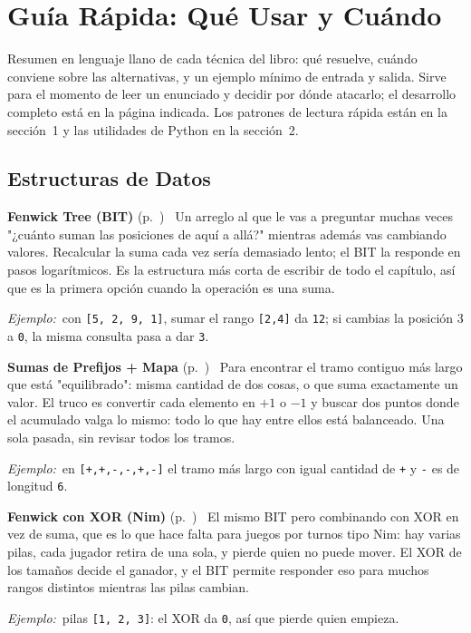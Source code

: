 \clearpage
\section{Guía Rápida: Qué Usar y Cuándo}

Resumen en lenguaje llano de cada técnica del libro: qué resuelve, cuándo conviene
sobre las alternativas, y un ejemplo mínimo de entrada y salida. Sirve para el
momento de leer un enunciado y decidir por dónde atacarlo; el desarrollo completo
está en la página indicada. Los patrones de lectura rápida están en la sección~1 y
las utilidades de Python en la sección~2.

\newcommand{\guia}[2]{\medskip\noindent\textbf{#1} \textnormal{(p.~\pageref{#2})}\ }
\newcommand{\ej}{\par\smallskip\noindent\textit{Ejemplo:}\ }

\subsection*{Estructuras de Datos}

\guia{Fenwick Tree (BIT)}{alg:3-1}
Un arreglo al que le vas a preguntar muchas veces "¿cuánto suman las posiciones de
aquí a allá?" mientras además vas cambiando valores. Recalcular la suma cada vez
sería demasiado lento; el BIT la responde en pasos logarítmicos. Es la estructura
más corta de escribir de todo el capítulo, así que es la primera opción cuando la
operación es una suma.
\ej con \texttt{[5, 2, 9, 1]}, sumar el rango \texttt{[2,4]} da \texttt{12}; si
cambias la posición 3 a \texttt{0}, la misma consulta pasa a dar \texttt{3}.

\guia{Sumas de Prefijos + Mapa}{alg:3-2}
Para encontrar el tramo contiguo más largo que está "equilibrado": misma cantidad
de dos cosas, o que suma exactamente un valor. El truco es convertir cada elemento
en $+1$ o $-1$ y buscar dos puntos donde el acumulado valga lo mismo: todo lo que
hay entre ellos está balanceado. Una sola pasada, sin revisar todos los tramos.
\ej en \texttt{[+,+,-,-,+,-]} el tramo más largo con igual cantidad de \texttt{+}
y \texttt{-} es de longitud \texttt{6}.

\guia{Fenwick con XOR (Nim)}{alg:3-3}
El mismo BIT pero combinando con XOR en vez de suma, que es lo que hace falta para
juegos por turnos tipo Nim: hay varias pilas, cada jugador retira de una sola, y
pierde quien no puede mover. El XOR de los tamaños decide el ganador, y el BIT
permite responder eso para muchos rangos distintos mientras las pilas cambian.
\ej pilas \texttt{[1, 2, 3]}: el XOR da \texttt{0}, así que pierde quien empieza.


